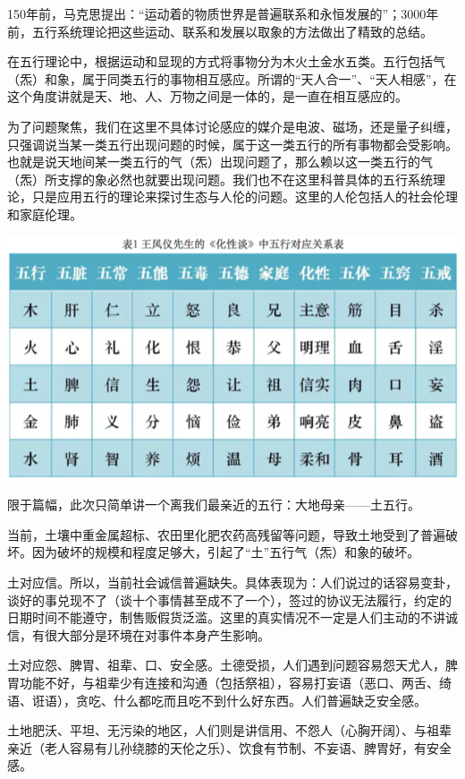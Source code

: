 \documentclass[]{book}
\begin{document}
150年前，马克思提出：``运动着的物质世界是普遍联系和永恒发展的''；3000年前，五行系统理论把这些运动、联系和发展以取象的方法做出了精致的总结。

在五行理论中，根据运动和显现的方式将事物分为木火土金水五类。五行包括气（炁）和象，属于同类五行的事物相互感应。所谓的``天人合一''、``天人相感''，在这个角度讲就是天、地、人、万物之间是一体的，是一直在相互感应的。

为了问题聚焦，我们在这里不具体讨论感应的媒介是电波、磁场，还是量子纠缠，只强调说当某一类五行出现问题的时候，属于这一类五行的所有事物都会受影响。也就是说天地间某一类五行的气（炁）出现问题了，那么赖以这一类五行的气（炁）所支撑的象必然也就要出现问题。我们也不在这里科普具体的五行系统理论，只是应用五行的理论来探讨生态与人伦的问题。这里的人伦包括人的社会伦理和家庭伦理。

\includegraphics[width=8.33in]{images/swr3}

限于篇幅，此次只简单讲一个离我们最亲近的五行：大地母亲------土五行。

当前，土壤中重金属超标、农田里化肥农药高残留等问题，导致土地受到了普遍破坏。因为破坏的规模和程度足够大，引起了``土''五行气（炁）和象的破坏。

土对应信。所以，当前社会诚信普遍缺失。具体表现为：人们说过的话容易变卦，谈好的事兑现不了（谈十个事情甚至成不了一个），签过的协议无法履行，约定的日期时间不能遵守，制售贩假货泛滥。这里的真实情况不一定是人们主动的不讲诚信，有很大部分是环境在对事件本身产生影响。

土对应怨、脾胃、祖辈、口、安全感。土德受损，人们遇到问题容易怨天尤人，脾胃功能不好，与祖辈少有连接和沟通（包括祭祖），容易打妄语（恶口、两舌、绮语、诳语），贪吃、什么都吃而且吃不到什么好东西。人们普遍缺乏安全感。

土地肥沃、平坦、无污染的地区，人们则是讲信用、不怨人（心胸开阔）、与祖辈亲近（老人容易有儿孙绕膝的天伦之乐）、饮食有节制、不妄语、脾胃好，有安全感。
\end{document}
